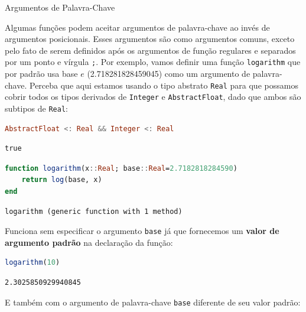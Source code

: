 \documentclass[
  notoc %
]{tufte-book}
\makeatletter
\newcommand{\passthrough}[1]{#1}
\renewcommand\subsubsection{%
\@startsection{subsubsection}{3}{\z@ }{-3.25ex\@plus -1ex \@minus -.2ex}{1.5ex \@plus .2ex}{\normalfont \normalsize \bfseries }
}
\makeatother
\begin{document}
\hypertarget{sec:function_keyword_arguments}{%
\subsubsection{Argumentos de
Palavra-Chave}\label{sec:function_keyword_arguments}}

Algumas funções podem aceitar argumentos de palavra-chave ao invés de
argumentos posicionais. Esses argumentos são como argumentos comuns,
exceto pelo fato de serem definidos após os argumentos de função
regulares e separados por um ponto e vírgula
\passthrough{\lstinline!;!}. Por exemplo, vamos definir uma função
\passthrough{\lstinline!logarithm!} que por padrão usa base \(e\)
(2.718281828459045) como um argumento de palavra-chave. Perceba que aqui
estamos usando o tipo abstrato \passthrough{\lstinline!Real!} para que
possamos cobrir todos os tipos derivados de
\passthrough{\lstinline!Integer!} e
\passthrough{\lstinline!AbstractFloat!}, dado que ambos são subtipos de
\passthrough{\lstinline!Real!}:

\begin{lstlisting}[language=Julia]
AbstractFloat <: Real && Integer <: Real
\end{lstlisting}

\begin{lstlisting}[language=Output]
true
\end{lstlisting}

\begin{lstlisting}[language=Julia]
function logarithm(x::Real; base::Real=2.7182818284590)
    return log(base, x)
end
\end{lstlisting}

\begin{lstlisting}[language=Output]
logarithm (generic function with 1 method)
\end{lstlisting}

Funciona sem especificar o argumento \passthrough{\lstinline!base!} já
que fornecemos um \textbf{valor de argumento padrão} na declaração da
função:

\begin{lstlisting}[language=Julia]
logarithm(10)
\end{lstlisting}

\begin{lstlisting}[language=Output]
2.3025850929940845
\end{lstlisting}

E também com o argumento de palavra-chave \passthrough{\lstinline!base!}
diferente de seu valor padrão:
\end{document}
